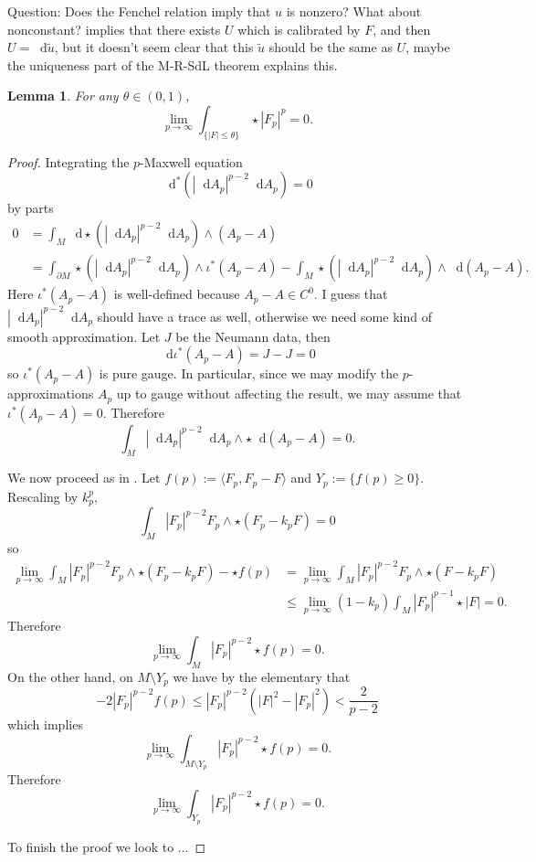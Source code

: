 \documentclass[reqno,11pt]{amsart}
\newcommand*\dif{\mathop{}\!\mathrm{d}}
\newtheorem{lemma}[theorem]{Lemma}
\theoremstyle{definition}
\numberwithin{equation}{section}
\begin{document}
Question: Does the Fenchel relation imply that $u$ is nonzero?
What about nonconstant?
\cite{bangert_cui_2017} implies that there exists $U$ which is calibrated by $F$, and then $U = \dif \tilde u$, but it doesn't seem clear that this $\tilde u$ should be the same as $U$, maybe the uniqueness part of the M-R-SdL theorem explains this.

\begin{lemma}
For any $\theta \in (0, 1)$,
	$$\lim_{p \to \infty} \int_{\{|F| \leq \theta\}} \star |F_p|^p = 0.$$
\end{lemma}
\begin{proof}
Integrating the $p$-Maxwell equation 
$$\dif^*(|\dif A_p|^{p - 2} \dif A_p) = 0$$
by parts 
\begin{align*}
	0 &= \int_M \dif \star (|\dif A_p|^{p - 2} \dif A_p) \wedge (A_p - A) \\
	&= \int_{\partial M} \star(|\dif A_p|^{p - 2} \dif A_p) \wedge \iota^* (A_p - A) - \int_M \star (|\dif A_p|^{p - 2} \dif A_p) \wedge \dif (A_p - A).
\end{align*}
Here $\iota^* (A_p - A)$ is well-defined because $A_p - A \in C^0$.
I guess that $|\dif A_p|^{p - 2} \dif A_p$ should have a trace as well, otherwise we need some kind of smooth approximation.
Let $J$ be the Neumann data, then 
$$\dif \iota^*(A_p - A) = J - J = 0$$
so $\iota^*(A_p - A)$ is pure gauge. In particular, since we may modify the $p$-approximations $A_p$ up to gauge without affecting the result, we may assume that $\iota^*(A_p - A) = 0$.
Therefore 
$$\int_M |\dif A_p|^{p - 2} \dif A_p \wedge \star \dif (A_p - A) = 0.$$

We now proceed as in \cite[Lemma 6.3]{daskalopoulos2020transverse}.
Let $f(p) := \langle F_p, F_p - F\rangle$ and $Y_p := \{f(p) \geq 0\}$.
Rescaling by $k_p^p$, 
$$\int_M |F_p|^{p - 2} F_p \wedge \star (F_p - k_p F) = 0$$
so 
\begin{align*}
	\lim_{p \to \infty} \int_M |F_p|^{p - 2} F_p \wedge \star (F_p - k_p F) - \star f(p) 
	&= \lim_{p \to \infty} \int_M |F_p|^{p - 2} F_p \wedge \star (F - k_p F) \\
	&\leq \lim_{p \to \infty} (1 - k_p) \int_M |F_p|^{p - 1} \star |F| = 0.
\end{align*}
Therefore 
$$\lim_{p \to \infty} \int_M |F_p|^{p - 2} \star f(p) = 0.$$
On the other hand, on $M \setminus Y_p$ we have by the elementary \cite[Lemma 6.2]{daskalopoulos2020transverse} that 
$$
	-2|F_p|^{p - 2} f(p) \leq |F_p|^{p - 2} (|F|^2 - |F_p|^2) < \frac{2}{p - 2}
$$
which implies 
$$\lim_{p \to \infty} \int_{M \setminus Y_p} |F_p|^{p - 2} \star f(p) = 0.$$
Therefore 
$$\lim_{p \to \infty} \int_{Y_p} |F_p|^{p - 2} \star f(p) = 0.$$

To finish the proof we look to \cite[Proposition 6.5]{daskalopoulos2020transverse}...
\end{proof}
\end{document}
